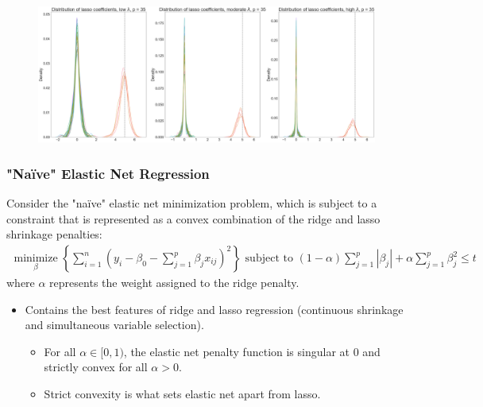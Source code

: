 \begin{frame}[fragile]
    \begin{figure}[b]
        \includegraphics[scale=0.15]{Img/lasso_shrunken_beta_dist_35.png}
        \centering
    \end{figure}
\end{frame}
\begin{frame}[fragile]
    \frametitle{"Naïve" Elastic Net Regression}
    Consider the "naïve" elastic net minimization problem, which is subject to a constraint that is represented as a convex combination of the ridge and lasso shrinkage penalties:
    \begin{align}
    \label{eqn:eqn6}
    \underset{\beta}{\operatorname{minimize}}\left\{\sum_{i=1}^{n}\left(y_{i}-\beta_{0}-\sum_{j=1}^{p} \beta_{j} x_{i j}\right)^{2}\right\} \text { subject to } \left(1 - \alpha \right)\sum_{j=1}^{p}\left|\beta_{j}\right| + \alpha \sum_{j=1}^{p}\beta_{j}^{2} \leq t
    \end{align}
    where $\alpha$ represents the weight assigned to the ridge penalty. 
    \begin{itemize}
        \item Contains the best features of ridge and lasso regression (continuous shrinkage and simultaneous variable selection).
        \begin{itemize}
            \item For all $\alpha \in [0, 1)$, the elastic net penalty function is singular at 0 and strictly convex for all $\alpha > 0$.
            \item Strict convexity is what sets elastic net apart from lasso.
        \end{itemize}
    \end{itemize}
\end{frame}
